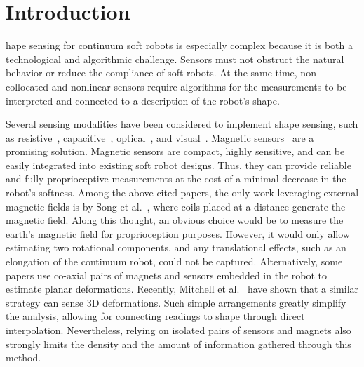 \section{Introduction}\label{sec:promasens:introduction}
%
%
%
hape sensing for continuum soft robots is especially complex because it is both a technological and algorithmic challenge. Sensors must not obstruct the natural behavior or reduce the compliance of soft robots. At the same time, non-collocated and nonlinear sensors require algorithms for the measurements to be interpreted and connected to a description of the robot's shape.

Several sensing modalities have been considered to implement shape sensing, such as resistive~\cite{shih2019design, kramer2011soft}, capacitive~\cite{scimeca2019model, shintake2018ultrastretchable}, optical~\cite{li2021scaling}, and visual~\cite{rosi2022sensing}. Magnetic sensors~\cite{song2015electromagnetic, ozel2015precise, luo2017toward, guo2019continuum, mitchell2021fast} are a promising solution. Magnetic sensors are compact, highly sensitive, and can be easily integrated into existing soft robot designs. Thus, they can provide reliable and fully proprioceptive measurements at the cost of a minimal decrease in the robot's softness. Among the above-cited papers, the only work leveraging external magnetic fields is by Song et al.~\cite{song2015electromagnetic}, where coils placed at a distance generate the magnetic field.
Along this thought, an obvious choice would be to measure the earth's magnetic field for proprioception purposes. However, it would only allow estimating two rotational components, and any translational effects, such as an elongation of the continuum robot, could not be captured.
Alternatively, some papers \cite{ozel2015precise,luo2017toward,guo2019continuum} use co-axial pairs of magnets and sensors embedded in the robot to estimate planar deformations. Recently, Mitchell et al.~\cite{mitchell2021fast} have shown that a similar strategy can sense 3D deformations. Such simple arrangements greatly simplify the analysis, allowing for connecting readings to shape through direct interpolation. Nevertheless, relying on isolated pairs of sensors and magnets also strongly limits the density and the amount of information gathered through this method.

